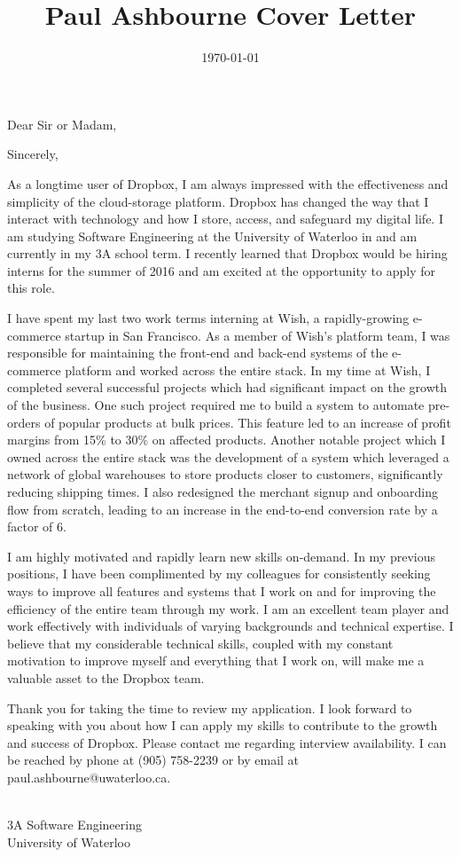 \documentclass[11pt,letterpaper,sans]{moderncv}        %
\title{Paul Ashbourne Cover Letter}
\begin{document}
\date{\today}
\opening{Dear Sir or Madam,}
\closing{Sincerely,}
\makelettertitle

As a longtime user of Dropbox, I am always impressed with the effectiveness and simplicity of the cloud-storage platform.
Dropbox has changed the way that I interact with technology and how I store, access, and safeguard my digital life. I am
studying Software Engineering at the University of Waterloo in and am currently in my 3A school term.
I recently learned that Dropbox would be hiring interns for the summer of 2016 and am excited at the opportunity to apply
for this role.

I have spent my last two work terms interning at Wish, a rapidly-growing e-commerce startup in San Francisco.
As a member of Wish's platform team, I was responsible for maintaining the front-end and back-end systems of
the e-commerce platform and worked across the entire stack. In my time at Wish, I completed several successful
projects which had significant impact on the growth of the business. One such project required me to build a
system to automate pre-orders of popular products at bulk prices. This feature led to an increase of profit margins
from 15\% to 30\% on affected products. Another notable project which I owned across the entire stack was the
development of a system which leveraged a network of global warehouses to store products closer to customers,
significantly reducing shipping times. I also redesigned the merchant signup and onboarding flow from scratch,
leading to an increase in the end-to-end conversion rate by a factor of 6.

I am highly motivated and rapidly learn new skills on-demand. In my previous positions, I have been complimented
by my colleagues for consistently seeking ways to improve all features and systems that I work on and for
improving the efficiency of the entire team through my work. I am an excellent team player and work effectively
with individuals of varying backgrounds and technical expertise. I believe that my considerable technical skills,
coupled with my constant motivation to improve myself and everything that I work on, will make me a valuable asset
to the Dropbox team.

Thank you for taking the time to review my application. I look forward to speaking with you about how I can
apply my skills to contribute to the growth and success of Dropbox. Please contact me regarding interview
availability. I can be reached by phone at (905) 758-2239 or by email at paul.ashbourne@uwaterloo.ca.

\makeletterclosing\\
3A Software Engineering\\
University of Waterloo
\end{document}
